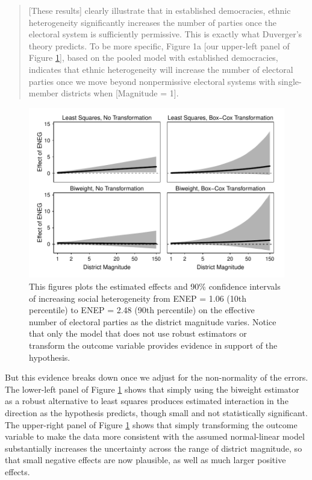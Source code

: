 \documentclass[12pt]{article}
\begin{document}
\begin{quote}
[These results] clearly illustrate that in established democracies, ethnic heterogeneity significantly increases the number of parties once the electoral system is sufficiently permissive. 
This is exactly what Duverger's theory predicts. 
To be more specific, Figure 1a [our upper-left panel of Figure \ref{fig:cg-fd-plots}], based on the pooled model with established democracies, indicates that ethnic heterogeneity will increase the number of electoral parties once we move beyond nonpermissive electoral systems with single-member districts when [Magnitude = 1].
\end{quote}

\begin{figure}[h!]
\begin{center}
\includegraphics[width = \textwidth]{figs/cg-fd-plots.pdf}
\caption{This figures plots the estimated effects and 90\% confidence intervals of increasing social heterogeneity from ENEP = 1.06 (10th percentile) to ENEP = 2.48 (90th percentile) on the effective number of electoral parties as the district magnitude varies. 
Notice that only the model that does not use robust estimators or transform the outcome variable provides evidence in support of the hypothesis.}\label{fig:cg-fd-plots}
\end{center}
\end{figure}

But this evidence breaks down once we adjust for the non-normality of the errors. 
The lower-left panel of Figure \ref{fig:cg-fd-plots} shows that simply using the biweight estimator as a robust alternative to least squares produces estimated interaction in the  direction as the hypothesis predicts, though small and not statistically significant. 
The upper-right panel of Figure \ref{fig:cg-fd-plots} shows that simply transforming the outcome variable to make the data more consistent with the assumed normal-linear model substantially increases the uncertainty across the range of district magnitude, so that small negative effects are now plausible, as well as much larger positive effects. 
\end{document}
